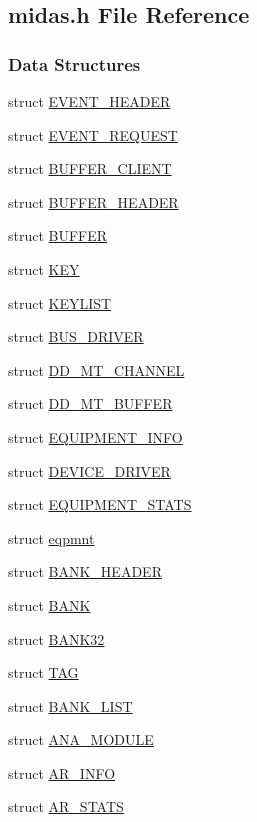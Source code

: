 \subsection{midas.h File Reference}
\label{midas_8h}
\subsubsection*{Data Structures}
\begin{DoxyCompactItemize}
\item 
struct \hyperlink{structEVENT__HEADER}{EVENT\_\-HEADER}
\item 
struct \hyperlink{structEVENT__REQUEST}{EVENT\_\-REQUEST}
\item 
struct \hyperlink{structBUFFER__CLIENT}{BUFFER\_\-CLIENT}
\item 
struct \hyperlink{structBUFFER__HEADER}{BUFFER\_\-HEADER}
\item 
struct \hyperlink{structBUFFER}{BUFFER}
\item 
struct \hyperlink{structKEY}{KEY}
\item 
struct \hyperlink{structKEYLIST}{KEYLIST}
\item 
struct \hyperlink{structBUS__DRIVER}{BUS\_\-DRIVER}
\item 
struct \hyperlink{structDD__MT__CHANNEL}{DD\_\-MT\_\-CHANNEL}
\item 
struct \hyperlink{structDD__MT__BUFFER}{DD\_\-MT\_\-BUFFER}
\item 
struct \hyperlink{structEQUIPMENT__INFO}{EQUIPMENT\_\-INFO}
\item 
struct \hyperlink{structDEVICE__DRIVER}{DEVICE\_\-DRIVER}
\item 
struct \hyperlink{structEQUIPMENT__STATS}{EQUIPMENT\_\-STATS}
\item 
struct \hyperlink{structeqpmnt}{eqpmnt}
\item 
struct \hyperlink{structBANK__HEADER}{BANK\_\-HEADER}
\item 
struct \hyperlink{structBANK}{BANK}
\item 
struct \hyperlink{structBANK32}{BANK32}
\item 
struct \hyperlink{structTAG}{TAG}
\item 
struct \hyperlink{structBANK__LIST}{BANK\_\-LIST}
\item 
struct \hyperlink{structANA__MODULE}{ANA\_\-MODULE}
\item 
struct \hyperlink{structAR__INFO}{AR\_\-INFO}
\item 
struct \hyperlink{structAR__STATS}{AR\_\-STATS}

\end{DoxyCompactItemize}
